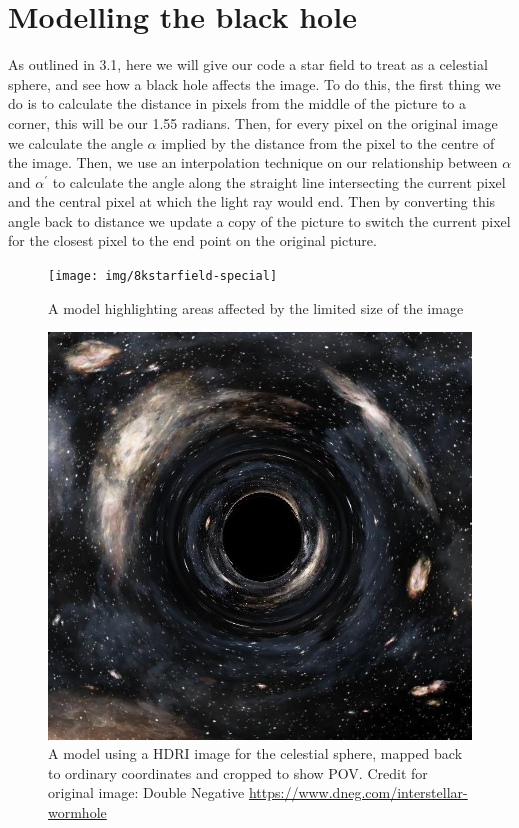 \documentclass[oneside,openright,frontopenright]{dmathesis}
\begin{document}
\section{Modelling the black hole}
	
	As outlined in 3.1, here we will give our code a star field to treat as a celestial sphere, and see how a black hole affects the image. To do this, the first thing we do is to calculate the distance in pixels from the middle of the picture to a corner, this will be our 1.55 radians. Then, for every pixel on the original image we calculate the angle $\alpha$ implied by the distance from the pixel to the centre of the image. Then, we use an interpolation technique on our relationship between $\alpha$ and $\alpha^{'}$ to calculate the angle along the straight line intersecting the current pixel and the central pixel at which the light ray would end. Then by converting this angle back to distance we update a copy of the picture to switch the current pixel for the closest pixel to the end point on the original picture.

\begin{figure}
	\centering
	\begin{minipage}[b]{0.6\textwidth}
		\texttt{[image: img/8kstarfield-special]}
		\caption{A model highlighting areas affected by the limited size of the image}
	\end{minipage}
\hfill
	\begin{minipage}[b]{0.6\textwidth}
		\includegraphics[width=\textwidth]{img/hdri-pov}
		\caption{A model using a HDRI image for the celestial sphere, mapped back to ordinary coordinates and cropped to show POV. Credit for original image: Double Negative \url{https://www.dneg.com/interstellar-wormhole}}
	\end{minipage}
\end{figure}
\end{document}
